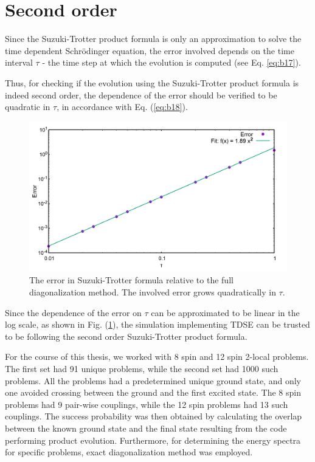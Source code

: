 \documentclass[../main.tex]{subfiles}
\begin{document}
\section{Second order}
Since the Suzuki-Trotter product formula is only an approximation to solve the time dependent Schr{\"o}dinger equation, the error involved depends on the time interval $\tau$ - the time step at which the evolution is computed (see Eq. \ref{eq:b17}). 

Thus, for checking if the evolution using the Suzuki-Trotter product formula is indeed second order, the dependence of the error should be verified to be quadratic in $\tau$, in accordance with Eq. (\ref{eq:b18}). 
\begin{figure}[H]
\centering 
\includegraphics[scale=0.2]{Error.png}
\caption{The error in Suzuki-Trotter formula relative to the full diagonalization method. The involved error grows quadratically in $\tau$.}
\label{fig:o1}
\end{figure}
Since the dependence of the error on $\tau$ can be approximated to be linear in the log scale, as shown in Fig. (\ref{fig:o1}), the simulation implementing TDSE can be trusted to be following the second order Suzuki-Trotter product formula.

For the course of this thesis, we worked with 8 spin and 12 spin 2-local problems. The first set had 91 unique problems, while the second set had 1000 such problems. All the problems had a predetermined unique ground state, and only one avoided crossing between the ground and the first excited state. The 8 spin problems had 9 pair-wise couplings, while the 12 spin problems had 13 such couplings. The success probability was then obtained by calculating the overlap between the known ground state and the final state resulting from the code performing product evolution. Furthermore, for determining the energy spectra for specific problems, exact diagonalization method was employed.
\end{document}
